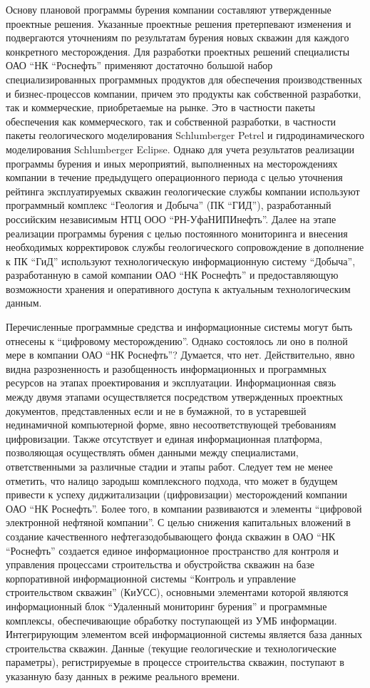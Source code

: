 Основу плановой программы бурения компании составляют утвержденные проектные решения.
Указанные проектные решения претерпевают изменения и подвергаются уточнениям по результатам бурения новых скважин для каждого конкретного месторождения.
Для разработки проектных решений специалисты ОАО ``НК ``Роснефть'' применяют достаточно большой набор специализированных программных продуктов для обеспечения производственных и бизнес-процессов компании, причем это продукты как собственной разработки, так и коммерческие, приобретаемые на рынке.
Это в частности пакеты обеспечения как коммерческого, так и собственной разработки, в частности пакеты геологического моделирования Schlumberger Petrel и гидродинамического моделирования Schlumberger Eclipse.
Однако для учета результатов реализации программы бурения и иных мероприятий, выполненных на месторождениях компании в течение предыдущего операционного периода с целью уточнения рейтинга эксплуатируемых скважин геологические службы компании используют программный комплекс ``Геология и Добыча'' (ПК ``ГИД''), разработанный российским независимым НТЦ ООО ``РН-УфаНИПИнефть''.
Далее на этапе реализации программы бурения с целью постоянного мониторинга и внесения необходимых корректировок службы геологического сопровождение в дополнение к ПК ``ГиД'' используют технологическую информационную систему ``Добыча'', разработанную в самой компании ОАО ``НК Роснефть'' и предоставляющую возможности хранения и оперативного доступа к актуальным технологическим данным.

Перечисленные программные средства и информационные системы могут быть отнесены к ``цифровому месторождению''.
Однако состоялось ли оно в полной мере в компании ОАО ``НК Роснефть''? Думается, что нет.
Действительно, явно видна разрозненность и разобщенность информационных и программных ресурсов на этапах проектирования и эксплуатации.
Информационная связь между двумя этапами осуществляется посредством утвержденных проектных документов, представленных если и не в бумажной, то в устаревшей нединамичной компьютерной форме, явно несоответствующей требованиям цифровизации.
Также отсутствует и единая информационная платформа, позволяющая осуществлять обмен данными между специалистами, ответственными за различные стадии и этапы работ.
Следует тем не менее отметить, что налицо зародыш комплексного подхода, что может в будущем привести к успеху диджитализации (цифровизации) месторождений компании ОАО ``НК Роснефть''.
Более того, в компании развиваются и элементы ``цифровой электронной нефтяной компании''.
С целью снижения капитальных вложений в создание качественного нефтегазодобывающего фонда скважин в ОАО ``НК ``Роснефть'' создается единое информационное пространство для контроля и управления процессами строительства и обустройства скважин на базе корпоративной информационной системы ``Контроль и управление строительством скважин'' (КиУСС), основными элементами которой являются информационный блок ``Удаленный мониторинг бурения'' и программные комплексы, обеспечивающие обработку поступающей из УМБ информации.
Интегрирующим элементом всей информационной системы является база данных строительства скважин.
Данные (текущие геологические и технологические параметры), регистрируемые в процессе строительства скважин, поступают в указанную базу данных в режиме реального времени.

